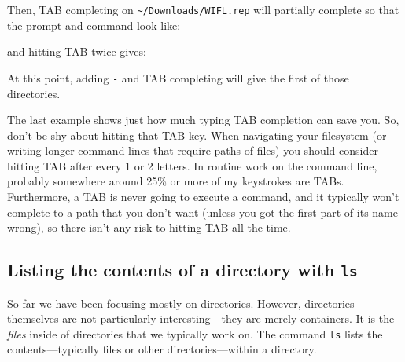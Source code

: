 \documentclass[]{krantz}
\makeatletter
\newenvironment{Shaded}{\begin{snugshade}}{\end{snugshade}}
\newcommand{\ExtensionTok}[1]{#1}
\newcommand{\NormalTok}[1]{#1}
\newenvironment{kframe}{%
\medskip{}
\setlength{\fboxsep}{.8em}
 \def\at@end@of@kframe{}%
 \ifinner\ifhmode%
  \def\at@end@of@kframe{\end{minipage}}%
  \begin{minipage}{\columnwidth}%
 \fi\fi%
 \def\FrameCommand##1{\hskip\@totalleftmargin \hskip-\fboxsep
 \colorbox{shadecolor}{##1}\hskip-\fboxsep
     \hskip-\linewidth \hskip-\@totalleftmargin \hskip\columnwidth}%
 \MakeFramed {\advance\hsize-\width
   \@totalleftmargin\z@ \linewidth\hsize
   \@setminipage}}%
 {\par\unskip\endMakeFramed%
 \at@end@of@kframe}
\renewenvironment{Shaded}{\begin{kframe}}{\end{kframe}}
\makeatother
\begin{document}
\begin{enumerate}
  Then, TAB completing on \texttt{\textasciitilde{}/Downloads/WIFL.rep} will partially complete so that the prompt and command look like:

\begin{Shaded}
\begin{Highlighting}[]
\ExtensionTok{%
\end{Highlighting}
\end{Shaded}

  and hitting TAB twice gives:

\begin{Shaded}
\end{Shaded}

  At this point, adding \texttt{-} and TAB completing will give the first of those directories.
\end{enumerate}

The last example shows just how much typing TAB completion can save you. So, don't be
shy about hitting that TAB key. When navigating your filesystem (or writing longer command
lines that require paths of files) you should consider hitting TAB after every 1 or 2 letters.
In routine work on the command line, probably somewhere around 25\% or more of my keystrokes
are TABs. Furthermore, a TAB is never going to execute a command, and it typically won't
complete to a path that you don't want (unless you got the first part of its name wrong), so there
isn't any risk to hitting TAB all the time.

\hypertarget{listing-the-contents-of-a-directory-with-ls}{%
\subsection{\texorpdfstring{Listing the contents of a directory with \texttt{ls}}{Listing the contents of a directory with ls}}\label{listing-the-contents-of-a-directory-with-ls}}

So far we have been focusing mostly on directories. However, directories themselves
are not particularly interesting---they are merely containers. It is the \emph{files} inside of directories
that we typically work on. The command \texttt{ls} lists the contents---typically files or
other directories---within a directory.
\end{document}
